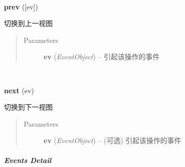 \documentclass[letterpaper,10pt,english]{sphinxmanual}
\begin{document}

\begin{fulllineitems}
\label{api/component/switchable/switchable:Switchable.prev}~
\begin{DUlineblock}{0em}
\item[] \textbf{prev} ({[}ev{]})
\item[] 切换到上一视图
\end{DUlineblock}
\begin{quote}\begin{description}
\item[{Parameters}] \leavevmode
\textbf{ev} (\emph{EventObject}) -- 引起该操作的事件

\end{description}\end{quote}

\end{fulllineitems}



\begin{fulllineitems}
\label{api/component/switchable/switchable:Switchable.next}~
\begin{DUlineblock}{0em}
\item[] \textbf{next} (ev)
\item[] 切换到下一视图
\end{DUlineblock}
\begin{quote}\begin{description}
\item[{Parameters}] \leavevmode
\textbf{ev} (\emph{EventObject}) -- (可选) 引起该操作的事件

\end{description}\end{quote}

\end{fulllineitems}



\subparagraph{Events Detail}
\label{api/component/switchable/switchable:events-detail}
\end{document}
